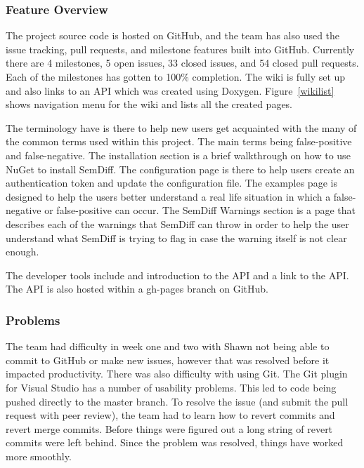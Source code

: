 \documentclass[draftclsnofoot,onecolumn]{IEEEtran}
\begin{document}
\subsubsection{Feature Overview}
The project source code is hosted on GitHub, and the team has also used the issue tracking, pull requests, and milestone features built into GitHub. Currently there are 4 milestones, 5 open issues, 33 closed issues, and 54 closed pull requests. Each of the milestones has gotten to 100\% completion. The wiki is fully set up and also links to an API which was created using Doxygen. Figure~\ref{wikilist} shows navigation menu for the wiki and lists all the created pages.

The terminology have is there to help new users get acquainted with the many of the common terms used within this project. The main terms being false-positive and false-negative. The installation section is a brief walkthrough on how to use NuGet to install SemDiff. The configuration page is there to help users create an authentication token and update the configuration file. The examples page is designed to help the users better understand a real life situation in which a false-negative or false-positive can occur. The SemDiff Warnings section is a page that describes each of the warnings that SemDiff can throw in order to help the user understand what SemDiff is trying to flag in case the warning itself is not clear enough.

The developer tools include and introduction to the API and a link to the API. The API is also hosted within a gh-pages branch on GitHub. 



\subsubsection{Problems}

The team had difficulty in week one and two with Shawn not being able to commit to GitHub or make new issues, however that was resolved before it impacted productivity. There was also difficulty with using Git. The Git plugin for Visual Studio has a number of usability problems. This led to code being pushed directly to the master branch. To resolve the issue (and submit the pull request with peer review), the team had to learn how to revert commits and revert merge commits. Before things were figured out a long string of revert commits were left behind. Since the problem was resolved, things have worked more smoothly.
\end{document}
